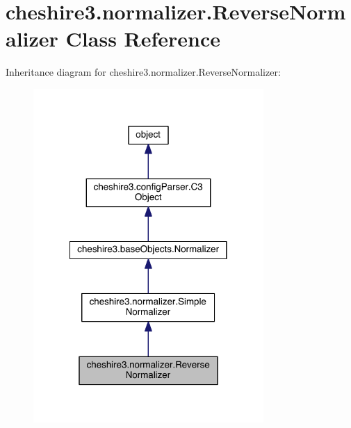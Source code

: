 \hypertarget{classcheshire3_1_1normalizer_1_1_reverse_normalizer}{\section{cheshire3.\-normalizer.\-Reverse\-Normalizer Class Reference}
\label{classcheshire3_1_1normalizer_1_1_reverse_normalizer}
}


Inheritance diagram for cheshire3.\-normalizer.\-Reverse\-Normalizer\-:
\nopagebreak
\begin{figure}[H]
\begin{center}
\leavevmode
\includegraphics[width=248pt]{classcheshire3_1_1normalizer_1_1_reverse_normalizer__inherit__graph}
\end{center}
\end{figure}


